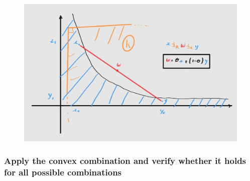 \documentclass{article}
\begin{document}
\begin{figure}[H]
    \centering
    \includegraphics[scale = 0.2]{figs/2.8_set.png}
\end{figure}

\subsubsection{Apply the convex combination and verify whether it holds for all possible combinations}
\end{document}
